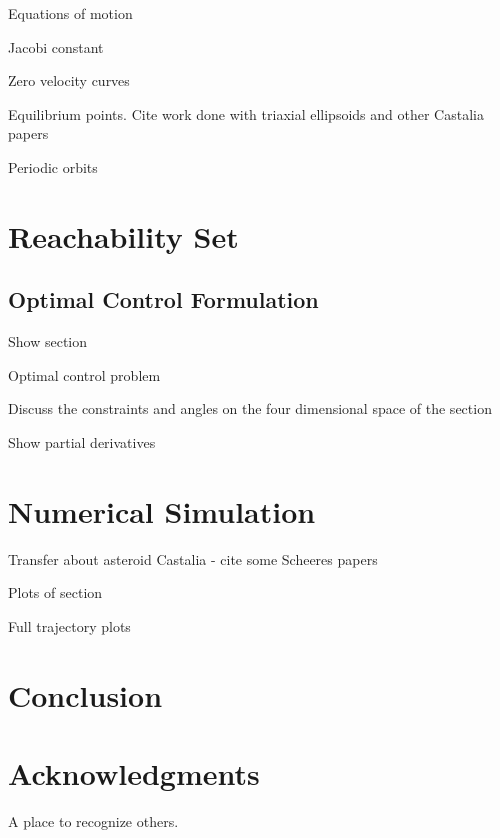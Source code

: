 \documentclass[]{aiaa-tc}%
\begin{document}
Equations of motion


Jacobi constant

Zero velocity curves

Equilibrium points. Cite work done with triaxial ellipsoids and other Castalia papers

Periodic orbits

\section{Reachability Set}

\subsection{Optimal Control Formulation}

Show \Poincare section

Optimal control problem 

Discuss the constraints and angles on the four dimensional space of the section

Show partial derivatives 

\section{Numerical Simulation}

Transfer about asteroid Castalia - cite some Scheeres papers

Plots of \Poincare section

Full trajectory plots

\section{Conclusion}


\section*{Acknowledgments}

A place to recognize others.

 

\end{document}
